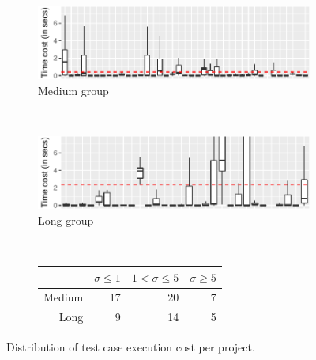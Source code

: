 \begin{figure}[ht]
    \centering

    \begin{subfigure}{0.5\textwidth}
      \centering
      \includegraphics[width=\textwidth]{plots/testcost-medium.pdf}
      \caption{\label{fig:medtcost}Medium group}
    \end{subfigure}\\
    \vspace{2.5ex}
    \begin{subfigure}{0.5\textwidth}
      \centering
      \includegraphics[width=\textwidth]{plots/testcost-long.pdf}
      \caption{\label{fig:longtcost}Long group}
    \end{subfigure}\\
    \vspace{2.5ex}
    \begin{subfigure}{0.5\textwidth}
      \centering
      \begin{tabular}{rrrr}
        \toprule
        & $\sigma\leq1$ & $1<\sigma\leq5$ & $\sigma\ge5$ \\
        \midrule    
        Medium & 17 & 20 & 7 \\
        Long   &  9 & 14 & 5 \\
        \bottomrule
      \end{tabular}
      \caption{\label{fig:sd}}    
    \end{subfigure}%

    \caption{\label{fig:time-distributions}Distribution of test case
    execution cost per project.}    
\end{figure}

